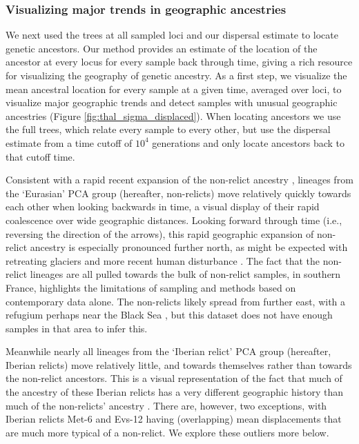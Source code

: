 \documentclass[12pt]{article}
\begin{document}
\subsubsection*{Visualizing major trends in geographic ancestries}

We next used the trees at all sampled loci and our dispersal estimate to locate genetic ancestors. Our method provides an estimate of the location of the ancestor at every locus for every sample back through time, giving a rich resource for visualizing the geography of genetic ancestry. As a first step, we visualize the mean ancestral location for every sample at a given time, averaged over loci, to visualize major geographic trends and detect samples with unusual geographic ancestries (Figure \ref{fig:thal_sigma_displaced}).
When locating ancestors we use the full trees, which relate every sample to every other, but use the dispersal estimate from a time cutoff of $10^4$ generations and only locate ancestors back to that cutoff time. 

Consistent with a rapid recent expansion of the non-relict ancestry \citep{lee2017post,hsu2019postglacial}, lineages from the `Eurasian' PCA group (hereafter, non-relicts) move relatively quickly towards each other when looking backwards in time, a visual display of their rapid coalescence over wide geographic distances. Looking forward through time (i.e., reversing the direction of the arrows), this rapid geographic expansion of non-relict ancestry is especially pronounced further north, as might be expected with retreating glaciers and more recent human disturbance \citep{lee2017post}. The fact that the non-relict lineages are all pulled towards the bulk of non-relict samples, in southern France, highlights the limitations of sampling and methods based on contemporary data alone. The non-relicts likely spread from further east, with a refugium perhaps near the Black Sea \citep{lee2017post,hsu2019postglacial}, but this dataset does not have enough samples in that area to infer this.

Meanwhile nearly all lineages from the `Iberian relict' PCA group (hereafter, Iberian relicts) move relatively little, and towards themselves rather than towards the non-relict ancestors. This is a visual representation of the fact that much of the ancestry of these Iberian relicts has a very different geographic history than much of the non-relicts' ancestry \citep{alonso2016,fulgione2018archaic}. There are, however, two exceptions, with Iberian relicts Met-6 and Evs-12 having (overlapping) mean displacements that are much more typical of a non-relict. We explore these outliers more below.
\end{document}

